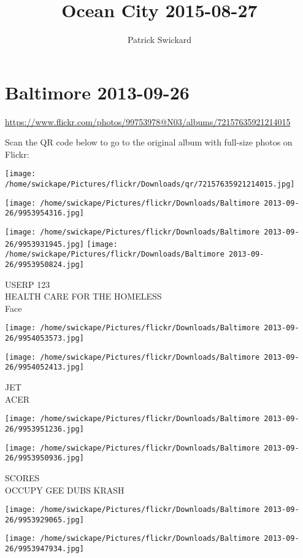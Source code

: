 \documentclass[10pt,letterpaper]{article}
\title{Ocean City 2015-08-27}
\author{Patrick Swickard}
\date{}
\begin{document}
\section*{Baltimore 2013-09-26}

\url{https://www.flickr.com/photos/99753978@N03/albums/72157635921214015}

Scan the QR code below to go to the original album with full-size photos on Flickr:

\texttt{[image: /home/swickape/Pictures/flickr/Downloads/qr/72157635921214015.jpg]}
\pagebreak

\texttt{[image: /home/swickape/Pictures/flickr/Downloads/Baltimore 2013-09-26/9953954316.jpg]}

\vspace{0.25in}
\texttt{[image: /home/swickape/Pictures/flickr/Downloads/Baltimore 2013-09-26/9953931945.jpg]}
\texttt{[image: /home/swickape/Pictures/flickr/Downloads/Baltimore 2013-09-26/9953950824.jpg]}

USERP 123\\
HEALTH CARE FOR THE HOMELESS\\
Face
\pagebreak

\texttt{[image: /home/swickape/Pictures/flickr/Downloads/Baltimore 2013-09-26/9954053573.jpg]}

\vspace{0.25in}
\texttt{[image: /home/swickape/Pictures/flickr/Downloads/Baltimore 2013-09-26/9954052413.jpg]}

JET\\
ACER
\pagebreak

\texttt{[image: /home/swickape/Pictures/flickr/Downloads/Baltimore 2013-09-26/9953951236.jpg]}

\vspace{0.25in}
\texttt{[image: /home/swickape/Pictures/flickr/Downloads/Baltimore 2013-09-26/9953950936.jpg]}

SCORES\\
OCCUPY GEE DUBS KRASH
\pagebreak

\texttt{[image: /home/swickape/Pictures/flickr/Downloads/Baltimore 2013-09-26/9953929065.jpg]}

\vspace{0.25in}
\texttt{[image: /home/swickape/Pictures/flickr/Downloads/Baltimore 2013-09-26/9953947934.jpg]}
\end{document}
